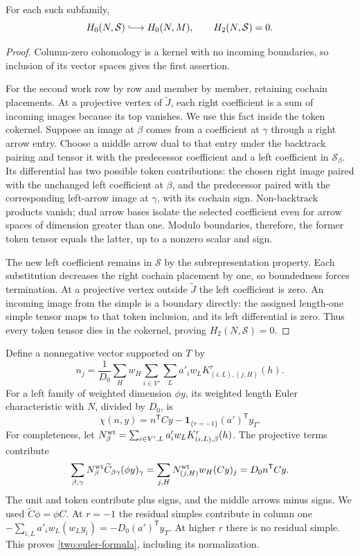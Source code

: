 \begin{lemma}
\label{two:subobject-tensor}
For each such subfamily,
\[
 H_0(N,\mathcal S)\lhook\joinrel\longrightarrow H_0(N,M),
 \qquad H_2(N,\mathcal S)=0.
\]
\end{lemma}
\begin{proof}
Column-zero cohomology is a kernel with no incoming boundaries,
so inclusion of its vector spaces gives the first assertion.

For the second work row by row and member by member, retaining
cochain placements.  At a projective vertex of $\widetilde J$,
each right coefficient is a sum of incoming images because its
top vanishes.  We use this fact inside the token cokernel.
Suppose an image at $\beta$ comes from a coefficient at $\gamma$
through a right arrow entry.  Choose a middle arrow dual to that
entry under the backtrack pairing and tensor it with the predecessor
coefficient and a left coefficient in $\mathcal S_\beta$.
Its differential has two possible token contributions: the chosen
right image paired with the unchanged left coefficient at $\beta$,
and the predecessor paired with the corresponding left-arrow image
at $\gamma$, with its cochain sign.  Non-backtrack products vanish;
dual arrow bases isolate the selected coefficient even for arrow
spaces of dimension greater than one.  Modulo boundaries, therefore,
the former token tensor equals the latter, up to a nonzero scalar
and sign.

The new left coefficient remains in $\mathcal S$ by the
subrepresentation property.  Each substitution decreases the right
cochain placement by one, so boundedness forces termination.  At a
projective vertex outside $\widetilde J$ the left coefficient is
zero.  An incoming image from the simple is a boundary directly:
the assigned length-one simple tensor maps to that token inclusion,
and its left differential is zero.  Thus every token tensor dies
in the cokernel, proving $H_2(N,\mathcal S)=0$.
\end{proof}

Define a nonnegative vector supported on $T$ by
\begin{equation}
 n_j=\frac1{D_0}\sum_H w_H
       \sum_{i\in V'}\sum_L a'_i w_L
                  K^r_{(i,L),(j,H)}(h).
 \label{two:right-weight}
\end{equation}
For a left family of weighted dimension $\phi y$, its weighted
length Euler characteristic with $N$, divided by $D_0$, is
\begin{equation}
 \chi(n,y)=n^{\mathsf T}Cy
           -\mathbf1_{\{r=-1\}}(a')^{\mathsf T}y_T.
 \label{two:euler-formula}
\end{equation}
For completeness, let
$N_\beta^{\mathrm{wt}}=\sum_{i\in V',L}a'_iw_LK^r_{(i,L),\beta}(h)$.
The projective terms contribute
\[
 \sum_{\beta,\gamma}N_\beta^{\mathrm{wt}}\widetilde C_{\beta\gamma}
              (\phi y)_\gamma
 =\sum_{j,H}N_{(j,H)}^{\mathrm{wt}}w_H(Cy)_j
 =D_0n^{\mathsf T}Cy.
\]
The unit and token contribute plus signs, and the middle arrows
minus signs.  We used $\widetilde C\phi=\phi C$.  At $r=-1$ the
residual simples contribute in column one
$-\sum_{i,L}a'_iw_L(w_Ly_i)=-D_0(a')^{\mathsf T}y_T$.
At higher $r$ there is no residual simple.  This proves
\eqref{two:euler-formula}, including its normalization.

